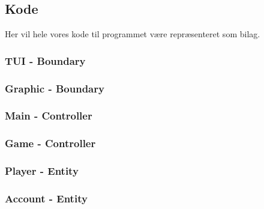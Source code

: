 \documentclass{article}
\begin{document}
\subsection{Kode}
Her vil hele vores kode til programmet være repræsenteret som bilag.
\subsubsection{TUI - Boundary}

\subsubsection{Graphic - Boundary}

\subsubsection{Main - Controller}

\subsubsection{Game - Controller}

\subsubsection{Player - Entity}

\subsubsection{Account - Entity}

\end{document}
